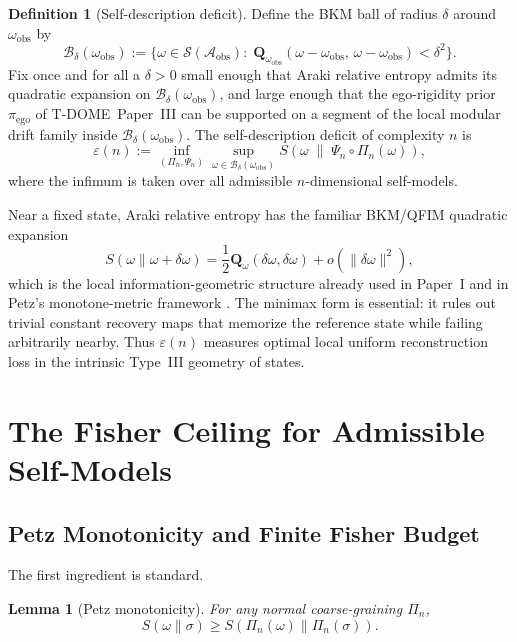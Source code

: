 \documentclass[12pt]{article}
\newtheorem{lemma}[theorem]{Lemma}
\theoremstyle{definition}
\newtheorem{definition}[theorem]{Definition}
\theoremstyle{remark}
\begin{document}
\begin{definition}[Self-description deficit]\label{def:2.3}
Define the BKM ball of radius \(\delta\) around
\(\omega_{\mathrm{obs}}\) by
\[
\mathcal{B}_\delta(\omega_{\mathrm{obs}})
:=
\bigl\{
\omega\in\mathcal{S}(\mathcal{A}_{\mathrm{obs}})
:\;
\mathbf{Q}_{\omega_{\mathrm{obs}}}(\omega-\omega_{\mathrm{obs}},\,
\omega-\omega_{\mathrm{obs}})
<\delta^2
\bigr\}.
\]
Fix once and for all a \(\delta>0\) small enough that Araki relative
entropy admits its quadratic expansion on
\(\mathcal{B}_\delta(\omega_{\mathrm{obs}})\), and large enough that
the ego-rigidity prior \(\pi_{\mathrm{ego}}\) of
T-DOME~Paper~III\cite{TDOMEIII} can be supported on a segment of the
local modular drift family inside
\(\mathcal{B}_\delta(\omega_{\mathrm{obs}})\). The self-description
deficit of complexity \(n\) is
\[
\varepsilon(n)
:=
\inf_{(\Pi_n,\Psi_n)}
\sup_{\omega\in \mathcal{B}_\delta(\omega_{\mathrm{obs}})}
S\!\left(
\omega
\;\middle\|\;
\Psi_n\circ\Pi_n(\omega)
\right),
\]
where the infimum is taken over all admissible \(n\)-dimensional
self-models.
\end{definition}

Near a fixed state, Araki relative entropy has the familiar BKM/QFIM
quadratic expansion
\[
S(\omega\|\omega+\delta\omega)
=
\frac{1}{2}\mathbf{Q}_\omega(\delta\omega,\delta\omega)
+o(\|\delta\omega\|^2),
\]
which is the local information-geometric structure already used in
Paper~I\cite{PaperI} and in Petz's monotone-metric framework
\cite{Petz1996}. The minimax form is essential: it rules out trivial
constant recovery maps that memorize the reference state while failing
arbitrarily nearby. Thus \(\varepsilon(n)\) measures optimal local
uniform reconstruction loss in the intrinsic Type~III geometry of
states.

\section{The Fisher Ceiling for Admissible Self-Models}\label{sec:3}

\subsection{Petz Monotonicity and Finite Fisher Budget}\label{subsec:3.1}

The first ingredient is standard.

\begin{lemma}[Petz monotonicity]\label{lem:3.1}
For any normal coarse-graining \(\Pi_n\),
\[
S(\omega\|\sigma)\ge S(\Pi_n(\omega)\|\Pi_n(\sigma)).
\]
\end{lemma}
\end{document}
